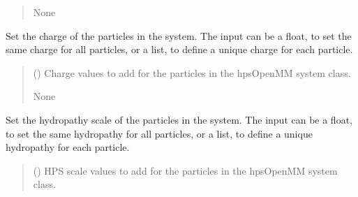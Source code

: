 \documentclass[letterpaper,10pt,english]{sphinxmanual}
\begin{document}
\begin{fulllineitems}
\begin{fulllineitems}
\begin{quote}
\begin{description}
\sphinxAtStartPar
None

\end{description}\end{quote}

\end{fulllineitems}


\begin{fulllineitems}
\label{\detokenize{modules/system:hps.core.system.setParticlesCharge}}
\pysigstartsignatures
{}
\pysigstopsignatures
\sphinxAtStartPar
Set the charge of the particles in the system. The input can be a
float, to set the same charge for all particles, or a list, to define
a unique charge for each particle.
\begin{quote}\begin{description}
\sphinxAtStartPar
{} () \textendash{} Charge values to add for the particles in the hpsOpenMM system class.

\sphinxAtStartPar
None

\end{description}\end{quote}

\end{fulllineitems}


\begin{fulllineitems}
\label{\detokenize{modules/system:hps.core.system.setParticlesHPS}}
\pysigstartsignatures
{}
\pysigstopsignatures
\sphinxAtStartPar
Set the hydropathy scale of the particles in the system. The input can be a
float, to set the same hydropathy for all particles, or a list, to define
a unique hydropathy for each particle.
\begin{quote}\begin{description}
\sphinxAtStartPar
{} () \textendash{} HPS scale values to add for the particles in the hpsOpenMM system class.


\end{description}
\end{quote}
\end{fulllineitems}
\end{fulllineitems}
\end{document}
